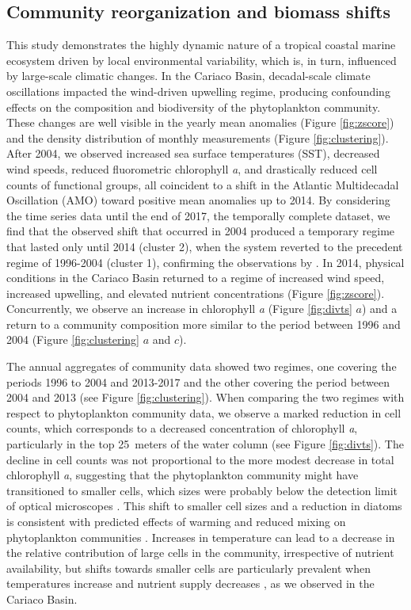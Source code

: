 \documentclass[draft]{agujournal2019}
\begin{document}
\subsection{Community reorganization and biomass shifts}
This study demonstrates the highly dynamic nature of a tropical coastal marine ecosystem driven by local environmental variability, which is, in turn, influenced by large-scale climatic changes. In the Cariaco Basin, decadal-scale climate oscillations impacted the wind-driven upwelling regime, producing confounding effects on the composition and biodiversity of the phytoplankton community.
These changes are well visible in the yearly mean anomalies (Figure \ref{fig:zscore}) and the density distribution of monthly measurements (Figure \ref{fig:clustering}). After 2004, we observed increased sea surface temperatures (SST), decreased wind speeds, reduced fluorometric chlorophyll \textit{a}, and drastically reduced cell counts of functional groups, all coincident to a shift in the Atlantic Multidecadal Oscillation (AMO) toward positive mean anomalies up to 2014. 
By considering the time series data until the end of 2017, the temporally complete dataset, we find that the observed shift that occurred in 2004 produced a temporary regime that lasted only until 2014 (cluster 2), when the system reverted to the precedent regime of 1996-2004 (cluster 1), confirming the observations by . In 2014, physical conditions in the Cariaco Basin returned to a regime of increased wind speed, increased upwelling, and elevated nutrient concentrations (Figure \ref{fig:zscore}). Concurrently, we observe an increase in chlorophyll \textit{a} (Figure \ref{fig:divts} $a$) and a return to a community composition more similar to the period between 1996 and 2004 (Figure \ref{fig:clustering} $a$ and $c$).

The annual aggregates of community data showed two regimes, one covering the periods 1996 to 2004 and 2013-2017 and the other covering the period between 2004 and 2013 (see Figure \ref{fig:clustering}).  
When comparing the two regimes with respect to phytoplankton community data, we observe a marked reduction in cell counts, which corresponds to a decreased concentration of chlorophyll \textit{a}, particularly in the top \qty{25}{meters} of the water column (see Figure \ref{fig:divts}). The decline in cell counts was not proportional to the more modest decrease in total chlorophyll \textit{a}, suggesting that the phytoplankton community might have transitioned to smaller cells, which sizes were probably below the detection limit of optical microscopes \cite{muller-karger_scientific_2019}. This shift to smaller cell sizes and a reduction in diatoms is consistent with predicted effects of warming and reduced mixing on phytoplankton communities \cite{bopp_response_2005}. Increases in temperature can lead to a decrease in the relative contribution of large cells in the community, irrespective of nutrient availability, but shifts towards smaller cells are particularly prevalent when temperatures increase and nutrient supply decreases \cite{mousing_global_2014}, as we observed in the Cariaco Basin. 
\end{document}
